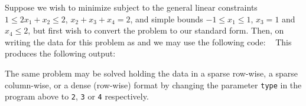 \documentclass{galahad}
\begin{document}
\galexample
Suppose we wish to minimize
subject to the general linear constraints 
$1 \leq 2 x_1 + x_2 \leq 2$, 
$x_2 + x_3 + x_4 = 2$, and simple bounds 
$-1 \leq x_1 \leq 1$, $x_3 = 1$ and $x_4 \leq 2$, but first wish to 
convert the problem to our standard form. 
Then, on writing the data for this problem as 
and
we may use the following code:
{\tt \small
\VerbatimInput{\packageexample}
}
\noindent
This produces the following output:
{\tt \small
\VerbatimInput{\packageresults}
}
\noindent

The same problem may be solved holding the data in a sparse row-wise, a sparse 
column-wise, or a dense (row-wise) format by changing the parameter 
{\tt type} in the program above to {\tt 2}, {\tt 3} or {\tt 4}
respectively.
\end{document}
